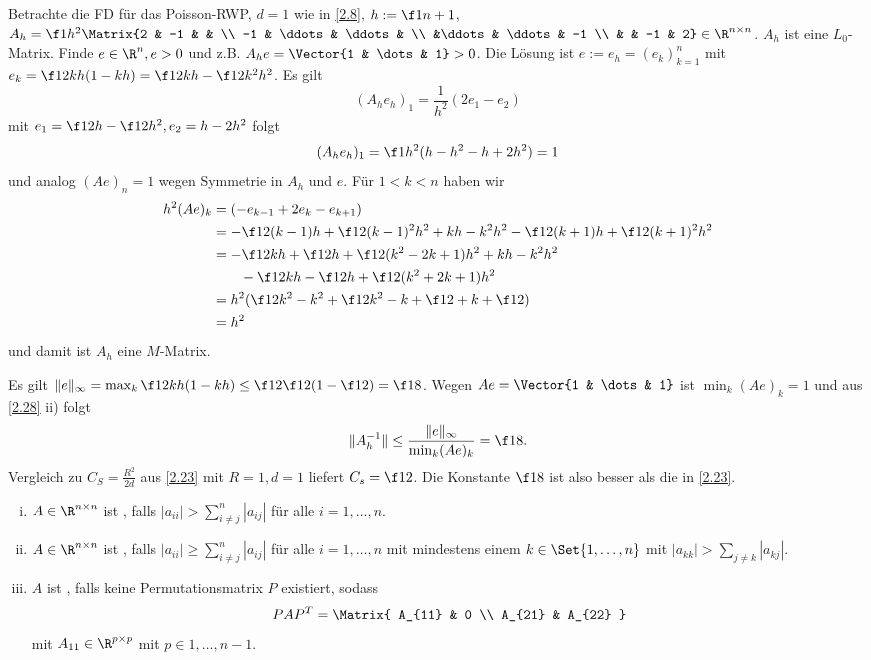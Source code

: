 \begin{ex*}
	Betrachte die FD für das Poisson-RWP, $d = 1$ wie in \ref{2.8}, $h := \f 1{n+1}$, $A_h = \f 1{h^2} \Matrix{2 & -1 &  & \\ -1 & \ddots & \ddots & \\ &\ddots & \ddots & -1 \\ & & -1 & 2} \in \R^{n\times n}$.
	$A_h$ ist eine $L_0$-Matrix.
	Finde $e \in \R^n, e > 0$ und z.B. $A_h e = \Vector{1 & \dots & 1} > 0$.
	Die Lösung ist $e := e_h = (e_k)_{k=1}^n$ mit $e_k = \f 12 k h  (1-kh) = \f 12 kh - \f 12 k^2h^2$.
	Es gilt
	\[
		(A_h e_h)_1 = \frac{1}{h^2} (2e_1 - e_2)
	\]
	mit $e_1 = \f 12 h - \f 12 h^2, e_2 = h - 2h^2$ folgt
	\[
		(A_h e_h)_1 = \f 1{h^2}(h - h^2 - h + 2h^2) = 1
	\]
	und analog $(Ae)_n = 1$ wegen Symmetrie in $A_h$ und $e$.
	Für $1 < k < n$ haben wir
	\begin{align*}
		h^2 (Ae)_k
		&= (-e_{k-1} + 2e_k - e_{k+1}) \\
		&= -\f 12 (k-1)h + \f 12(k-1)^2 h^2 + kh -k^2 h^2 - \f 12 (k+1)h + \f 12 (k+1)^2 h^2 \\
		&= -\f 12 kh + \f 12 h + \f 12(k^2 - 2k + 1)h^2 + kh - k^2h^2 \\
		&\qquad - \f 12 kh - \f 12 h + \f 12 (k^2 + 2k+1)h^2 \\
		&= h^2( \f 12 k^2 - k^2 + \f 12 k^2 - k + \f 12 + k + \f 12) \\
		&= h^2
	\end{align*}
	und damit ist $A_h$ eine $M$-Matrix.

	Es gilt $\|e\|_\infty = \max_k \f 12 kh(1-kh) \le \f 12 \f 12 ( 1 - \f 12) = \f 18$.
	Wegen $Ae = \Vector{1 & \dots & 1}$ ist $\min_k (Ae)_k = 1$ und aus \ref{2.28} ii) folgt
	\[
		\|A_h^{-1}\| \le \frac{\|e\|_\infty}{\min_k (Ae)_k} = \f 18.
	\]
	Vergleich zu $C_S = \frac{R^2}{2d}$ aus \ref{2.23} mit $R = 1, d=1$ liefert $C_s = \f 12$.
	Die Konstante $\f 18$ ist also besser als die in \ref{2.23}.
\end{ex*}

\begin{df}
	\begin{enumerate}[i)]
		\item
			$A \in \R^{n\times n}$ ist , falls $|a_{ii}| > \sum_{i \neq j}^n |a_{ij}|$ für alle $i = 1, \dotsc, n$.
		\item
			$A \in \R^{n\times n}$ ist , falls $|a_{ii}| \ge \sum_{i \neq j}^n |a_{ij}|$ für alle $i = 1, \dotsc, n$ mit mindestens einem $k \in \Set{1,\dotsc, n}$ mit $|a_{kk}| > \sum_{j \neq k} |a_{kj}|$.
		\item
			$A$ ist , falls keine Permutationsmatrix $P$ existiert, sodass
			\[
				P A P^T = \Matrix{ A_{11} & 0 \\ A_{21} & A_{22} }
			\]
			mit $A_{11} \in \R^{p\times p}$ mit $p \in {1, \dotsc, n-1}$.
	\end{enumerate}
\end{df}


